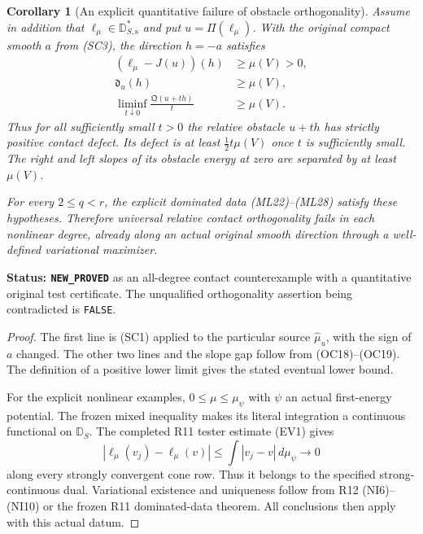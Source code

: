 \documentclass[11pt,a4paper]{article}
\numberwithin{equation}{section}
\newtheorem{corollary}[theorem]{Corollary}
\theoremstyle{definition}
\theoremstyle{remark}
\begin{document}
\begin{corollary}[An explicit quantitative failure of obstacle orthogonality]
\label{cor:r12-quantitative-contact-counterexample}
Assume in addition that
$\ell_\mu\in\mathbb D_{S,\mathrm s}^*$ and put
$u=\Pi(\ell_\mu)$.  With the original compact smooth
$a$ from \textup{(SC3)}, the direction $h=-a$ satisfies
\[
 \begin{split}
 (\ell_\mu-J(u))(h)&\ge\mu(V)>0,\\
 \mathfrak d_u(h)&\ge\mu(V),\\
 \liminf_{t\downarrow0}\frac{\mathfrak Q(u+th)}t
                                      &\ge\mu(V).
 \end{split}
 \tag{SC5}
\]
Thus for all sufficiently small $t>0$ the relative obstacle
$u+th$ has strictly positive contact defect.  Its defect is
at least $\tfrac12t\mu(V)$ once $t$ is sufficiently small.
The right and left slopes of its obstacle energy at zero
are separated by at least $\mu(V)$.

For every $2\le q<r$, the explicit dominated data
\textup{(ML22)--(ML28)} satisfy these hypotheses.  Therefore
universal relative contact orthogonality fails in each
nonlinear degree, already along an actual original smooth
direction through a well-defined variational maximizer.
\end{corollary}

\noindent\textbf{Status: \texttt{NEW\_PROVED}} as an
all-degree contact counterexample with a quantitative original
test certificate.  The unqualified orthogonality assertion
being contradicted is \texttt{FALSE}.

\begin{proof}
The first line is \textup{(SC1)} applied to the particular
source $\widehat\mu_u$, with the sign of $a$ changed.
The other two lines and the slope gap follow from
\textup{(OC18)--(OC19)}.  The definition of a positive
lower limit gives the stated eventual lower bound.

For the explicit nonlinear examples,
$0\le\mu\le\mu_\psi$ with $\psi$ an actual first-energy
potential.  The frozen mixed inequality makes its literal
integration a continuous functional on $\mathbb D_S$.
The completed R11 tester estimate \textup{(EV1)} gives
\[
 |\ell_\mu(v_j)-\ell_\mu(v)|
        \le\int|v_j-v|\,d\mu_\psi\longrightarrow0
\]
along every strongly convergent cone row.  Thus it belongs
to the specified strong-continuous dual.  Variational
existence and uniqueness follow from R12 \textup{(NI6)--(NI10)}
or the frozen R11 dominated-data theorem.  All conclusions
then apply with this actual datum.
\end{proof}
\end{document}
